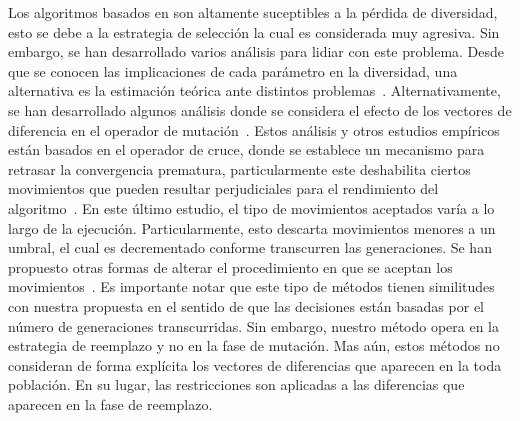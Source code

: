 Los algoritmos basados en \DE{} son altamente suceptibles a la pérdida de diversidad, esto se debe a la estrategia de selección la cual es considerada muy agresiva.
%
Sin embargo, se han desarrollado varios análisis para lidiar con este problema.
%
Desde que se conocen las implicaciones de cada parámetro en la diversidad, una alternativa es la estimación teórica ante distintos problemas\DE{}~\cite{zaharie2003control}.
%
Alternativamente, se han desarrollado algunos análisis donde se considera el efecto de los vectores de diferencia en el operador de mutación~\cite{montgomery2009differential}.
%
Estos análisis y otros estudios empíricos están basados en el operador de cruce, donde se establece un mecanismo para retrasar la convergencia prematura, particularmente este deshabilita ciertos movimientos que pueden resultar perjudiciales para el rendimiento del algoritmo~\cite{montgomery2012simple}.
%
En este último estudio, el tipo de movimientos aceptados varía a lo largo de la ejecución.
%
Particularmente, esto descarta movimientos menores a un umbral, el cual es decrementado conforme transcurren las generaciones.
%
Se han propuesto otras formas de alterar el procedimiento en que se aceptan los movimientos~\cite{bolufe2013differential}.
%
Es importante notar que este tipo de métodos tienen similitudes con nuestra propuesta en el sentido de que las decisiones están basadas por el número de generaciones transcurridas.
%
Sin embargo, nuestro método opera en la estrategia de reemplazo y no en la fase de mutación.
%
Mas aún, estos métodos no consideran de forma explícita los vectores de diferencias que aparecen en la toda población.
%
En su lugar, las restricciones son aplicadas a las diferencias que aparecen en la fase de reemplazo.

